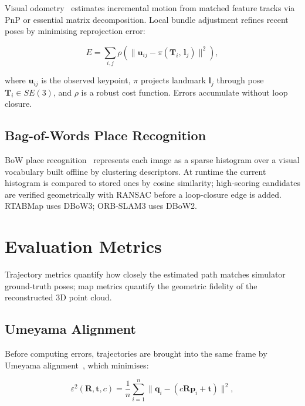 Visual odometry~\cite{scaramuzza2011visual} estimates incremental motion from
matched feature tracks via PnP or essential matrix decomposition.
Local bundle adjustment refines recent poses by minimising reprojection error:

\begin{equation}
  E = \sum_{i,j} \rho\!\left(
        \bigl\lVert \mathbf{u}_{ij} - \pi(\mathbf{T}_i,\, \mathbf{l}_j) \bigr\rVert^2
      \right),
  \label{eq:reprojection}
\end{equation}

\noindent where $\mathbf{u}_{ij}$ is the observed keypoint, $\pi$ projects
landmark $\mathbf{l}_j$ through pose $\mathbf{T}_i \in SE(3)$, and $\rho$ is
a robust cost function. Errors accumulate without loop closure.

\subsection{Bag-of-Words Place Recognition}
\label{sec:bow}

BoW place recognition~\cite{galvez2012bags} represents each image as a sparse
histogram over a visual vocabulary built offline by clustering descriptors.
At runtime the current histogram is compared to stored ones by cosine similarity;
high-scoring candidates are verified geometrically with RANSAC before a
loop-closure edge is added.
RTABMap uses DBoW3; ORB-SLAM3 uses DBoW2.

\section{Evaluation Metrics}
\label{sec:eval_metrics}

Trajectory metrics quantify how closely the estimated path matches simulator
ground-truth poses; map metrics quantify the geometric fidelity of the
reconstructed 3D point cloud.

\subsection{Umeyama Alignment}

Before computing errors, trajectories are brought into the same frame by
Umeyama alignment~\cite{umeyama1991least}, which minimises:

\begin{equation}
  \varepsilon^2(\mathbf{R}, \mathbf{t}, c) =
    \frac{1}{n}\sum_{i=1}^{n}
    \lVert \mathbf{q}_i - (c\mathbf{R}\mathbf{p}_i + \mathbf{t}) \rVert^2,
  \label{eq:umeyama_cost}
\end{equation}

